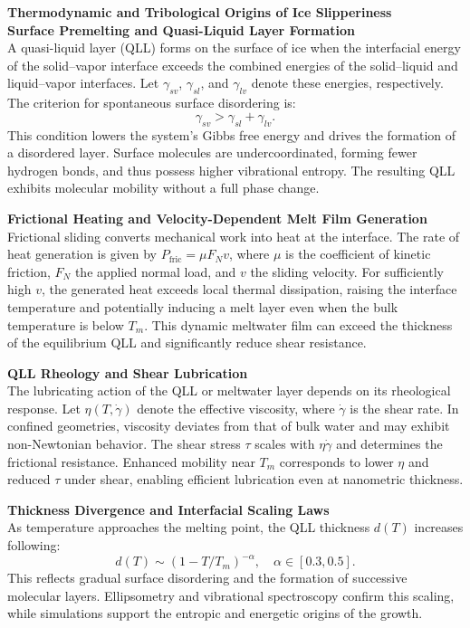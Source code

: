 \begin{technical}
{\Large\textbf{Thermodynamic and Tribological Origins of Ice Slipperiness}}\\[0.7em]

\textbf{Surface Premelting and Quasi-Liquid Layer Formation}\\[0.5em]
A quasi-liquid layer (QLL) forms on the surface of ice when the interfacial energy of the solid–vapor interface exceeds the combined energies of the solid–liquid and liquid–vapor interfaces. Let $\gamma_{sv}$, $\gamma_{sl}$, and $\gamma_{lv}$ denote these energies, respectively. The criterion for spontaneous surface disordering is:
\[
\gamma_{sv} > \gamma_{sl} + \gamma_{lv}.
\]
This condition lowers the system’s Gibbs free energy and drives the formation of a disordered layer. Surface molecules are undercoordinated, forming fewer hydrogen bonds, and thus possess higher vibrational entropy. The resulting QLL exhibits molecular mobility without a full phase change.

\textbf{Frictional Heating and Velocity-Dependent Melt Film Generation}\\[0.5em]
Frictional sliding converts mechanical work into heat at the interface. The rate of heat generation is given by $P_{\text{fric}} = \mu F_N v$, where $\mu$ is the coefficient of kinetic friction, $F_N$ the applied normal load, and $v$ the sliding velocity. For sufficiently high $v$, the generated heat exceeds local thermal dissipation, raising the interface temperature and potentially inducing a melt layer even when the bulk temperature is below $T_m$. This dynamic meltwater film can exceed the thickness of the equilibrium QLL and significantly reduce shear resistance.

\textbf{QLL Rheology and Shear Lubrication}\\[0.5em]
The lubricating action of the QLL or meltwater layer depends on its rheological response. Let $\eta(T, \dot{\gamma})$ denote the effective viscosity, where $\dot{\gamma}$ is the shear rate. In confined geometries, viscosity deviates from that of bulk water and may exhibit non-Newtonian behavior. The shear stress $\tau$ scales with $\eta \dot{\gamma}$ and determines the frictional resistance. Enhanced mobility near $T_m$ corresponds to lower $\eta$ and reduced $\tau$ under shear, enabling efficient lubrication even at nanometric thickness.

\textbf{Thickness Divergence and Interfacial Scaling Laws}\\[0.5em]
As temperature approaches the melting point, the QLL thickness $d(T)$ increases following:
\[
d(T) \sim \left(1 - {T}{/T_m} \right)^{-\alpha}, \quad \alpha \in [0.3, 0.5].
\]
This reflects gradual surface disordering and the formation of successive molecular layers. Ellipsometry and vibrational spectroscopy confirm this scaling, while simulations support the entropic and energetic origins of the growth.


\end{technical}
